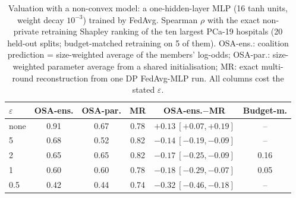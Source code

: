 \begin{table}[t]
\caption{Valuation with a non-convex model: a one-hidden-layer MLP (16 tanh units, weight decay $10^{\ensuremath{-}3}$) trained by FedAvg. Spearman $\rho$ with the exact non-private retraining Shapley ranking of the ten largest PCa-19 hospitals (20 held-out splits; budget-matched retraining on 5 of them). OSA-ens.: coalition prediction = size-weighted average of the members' log-odds; OSA-par.: size-weighted parameter average from a shared initialisation; MR: exact multi-round reconstruction from one DP FedAvg-MLP run. All columns cost the stated $\varepsilon$.}
\centering\scriptsize
\setlength{\tabcolsep}{4pt}
\begin{tabular}{lccccc}
\toprule
$\varepsilon$ & OSA-ens. & OSA-par. & MR & OSA-ens.$-$MR & Budget-m. \\
\midrule
none & 0.91 & 0.67 & 0.78 & $+0.13\ [+0.07, +0.19]$ & -- \\
5 & 0.68 & 0.52 & 0.82 & $-0.14\ [\ensuremath{-}0.19, \ensuremath{-}0.09]$ & -- \\
2 & 0.65 & 0.65 & 0.82 & $-0.17\ [\ensuremath{-}0.25, \ensuremath{-}0.09]$ & 0.16 \\
1 & 0.60 & 0.60 & 0.78 & $-0.18\ [\ensuremath{-}0.29, \ensuremath{-}0.07]$ & 0.05 \\
0.5 & 0.42 & 0.44 & 0.74 & $-0.32\ [\ensuremath{-}0.46, \ensuremath{-}0.18]$ & -- \\
\bottomrule
\end{tabular}
\label{tab:osa_mlp}
\end{table}
